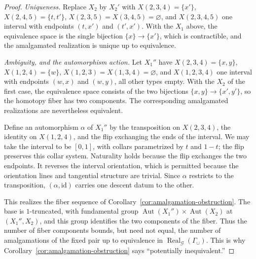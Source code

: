 \documentclass[11pt,letterpaper,twoside]{article}
\theoremstyle{plain}
\theoremstyle{definition}
\theoremstyle{remark}
\newcommand{\Real}{\operatorname{Real}}
\begin{document}
\begin{proof}
\emph{Uniqueness.}  Replace \(X_2\) by \(X_2'\) with \(X(2,3,4)=\{x'\}\), \(X(2,4,5)=\{t,t'\}\), \(X(2,3,5)=X(3,4,5)=\varnothing\), and \(X(2,3,4,5)\) one interval with endpoints \((t,x')\) and \((t',x')\).  With the \(X_1\) above, the equivalence space is the single bijection \(\{x\}\to\{x'\}\), which is contractible, and the amalgamated realization is unique up to equivalence.

\emph{Ambiguity, and the automorphism action.}  Let \(X_1''\) have \(X(2,3,4)=\{x,y\}\), \(X(1,2,4)=\{w\}\), \(X(1,2,3)=X(1,3,4)=\varnothing\), and \(X(1,2,3,4)\) one interval with endpoints \((w,x)\) and \((w,y)\), all other types empty.  With the \(X_2\) of the first case, the equivalence space consists of the two bijections \(\{x,y\}\to\{x',y'\}\), so the homotopy fiber has two components.  The corresponding amalgamated realizations are nevertheless equivalent.

Define an automorphism \(\alpha\) of \(X_1''\) by the transposition on \(X(2,3,4)\), the identity on \(X(1,2,4)\), and the flip exchanging the ends of the interval.  We may take the interval to be \([0,1]\), with collars parametrized by \(t\) and \(1-t\); the flip preserves this collar system.  Naturality holds because the flip exchanges the two endpoints.  It reverses the interval orientation, which is permitted because the orientation lines and tangential structure are trivial.  Since \(\alpha\) restricts to the transposition, \((\alpha,\mathrm{id})\) carries one descent datum to the other.

This realizes the fiber sequence of Corollary~\ref{cor:amalgamation-obstruction}.  The base is \(1\)-truncated, with fundamental group \(\operatorname{Aut}(X_1'')\times\operatorname{Aut}(X_2)\) at \((X_1'',X_2)\), and this group identifies the two components of the fiber.  Thus the number of fiber components bounds, but need not equal, the number of amalgamations of the fixed pair up to equivalence in \(\Real_{\mathcal G}(\Gamma_\cup)\).  This is why Corollary~\ref{cor:amalgamation-obstruction} says ``potentially inequivalent.''
\end{proof}
\end{document}
